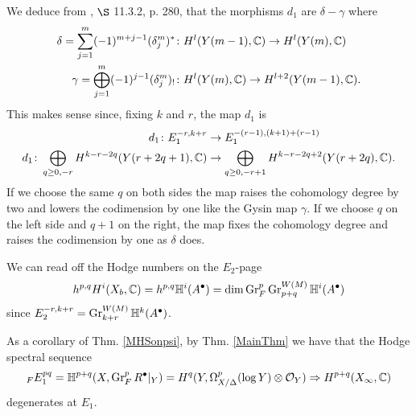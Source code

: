 \documentclass[../main.tex]{subfiles}
\begin{document}
We deduce from \cite{PS08}, $\S$ 11.3.2, p. 280, that the morphisms $d_1$ are $\delta-\gamma$ where 
\begin{align*}
    \delta = \sum_{j=1}^{m} (-1)^{m+j-1}(\delta_j^{m})^* &\colon H^l(Y(m-1),\mathbb{C}) \to H^l(Y(m),\mathbb{C}) \\ 
    \gamma = \bigoplus_{j=1}^m (-1)^{j-1} (\delta_j^m)_!  &\colon H^l(Y(m),\mathbb{C}) \to H^{l+2}(Y(m-1),\mathbb{C}).
\end{align*}
This makes sense since, fixing $k$ and $r$, the map $d_1$ is
\begin{align*}
d_1 \colon   {E_1^{-r,k+r}} &\to {E_1^{-(r-1),(k+1)+(r-1)}} \\
d_1 \colon  \bigoplus_{q \geq 0,-r } H^{k-r-2q}(Y(r+2q+1),\mathbb{C}) &\to \bigoplus_{q \geq 0,-r+1 } H^{k-r-2q+2}(Y(r+2q),\mathbb{C}).
\end{align*}
If we choose the same $q$ on both sides the map raises the cohomology degree by two and lowers the codimension by one like the Gysin map $\gamma$. If we choose $q$ on the left side and $q+1$ on the right, the map fixes the cohomology degree and raises the codimension by one as $\delta$ does.


We can read off the Hodge numbers on the $E_2$-page
\[
h^{p,q}H^i(X_b,\mathbb{C})=h^{p,q}\mathbb{H}^i(A^\bullet)= \dim \operatorname{Gr}^p_F \operatorname{Gr}^{W(M)}_{p+q} \mathbb{H}^i(A^\bullet)
\]
since $E^{-r,k+r}_2= \operatorname{Gr}_{k+r}^{W(M)} \mathbb{H}^k(A^\bullet) $.

As a corollary of Thm. \ref{MHSonpsi}, by Thm. \ref{MainThm} we have that the Hodge spectral sequence 
\[
_F E_1^{pq} = \mathbb{H}^{p+q}(X, \operatorname{Gr}_F^p R^\bullet|_Y)=H^q(Y,\Omega^p_{X/\Delta} (\log Y ) \otimes \mathcal{O}_Y) \Rightarrow H^{p+q} (X_{\infty}, \mathbb{C})
\]
degenerates at $E_1$.
\end{document}
